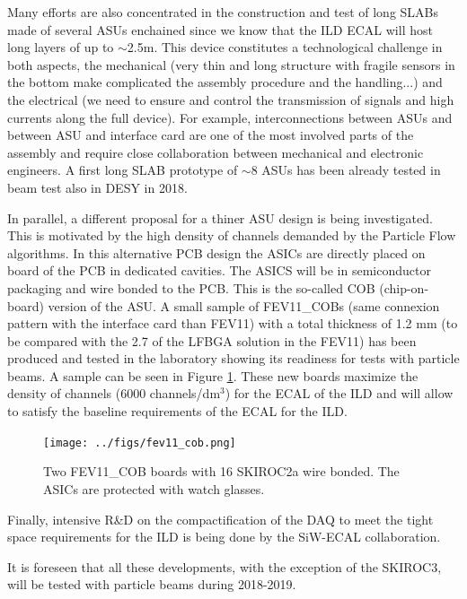\documentclass[a4paper,11pt]{article}
\begin{document}
Many efforts are also concentrated in the construction and test of long SLABs
made of several ASUs enchained since we know that the ILD ECAL will host long layers of up to $\sim$2.5m.
This device constitutes a technological challenge in both aspects, the mechanical
(very thin and long structure with fragile sensors in the bottom make complicated the assembly procedure and the handling...)
and the electrical (we need to ensure and control the transmission of signals and high currents along the full device).
For example, interconnections between ASUs and between ASU and interface card are one of
the most involved parts of the assembly
and require close collaboration between mechanical and electronic engineers.
A first long SLAB prototype
of $\sim8$ ASUs has been already tested in beam test also in DESY in 2018.

In parallel, a different proposal for a thiner ASU
design is being investigated. This is motivated by the high density of channels
demanded by the Particle Flow algorithms. 
In this alternative PCB design the ASICs
are directly placed on board of the PCB in dedicated cavities.
The ASICS will be in semiconductor packaging and wire bonded to the PCB. This is the so-called COB (chip-on-board) version of the ASU.
A small sample of FEV11\_COBs (same connexion pattern with the interface card than FEV11)
with a total thickness of 1.2 mm (to be compared with the 2.7 of the LFBGA solution in the FEV11)
has been produced and tested in the laboratory
showing its readiness for tests with particle beams. A sample can be seen in Figure \ref{cob}.
These new boards maximize the density of channels (6000 channels/dm$^{3}$) for the ECAL of the ILD
and will allow to satisfy the baseline requirements of the ECAL for the ILD.

\begin{figure}[!t]
  \centering
    \texttt{[image: ../figs/fev11\_cob.png]} 
  \caption{Two FEV11\_COB boards with 16 SKIROC2a wire bonded. The ASICs are protected with watch glasses.}
\label{cob}
\end{figure}

Finally, intensive R\&D on the compactification of
the DAQ to meet the tight space requirements for the ILD is being done by the SiW-ECAL collaboration.

It is foreseen that all these developments, with the exception of the SKIROC3, will be tested with particle beams during 2018-2019.


\acknowledgments
\end{document}
